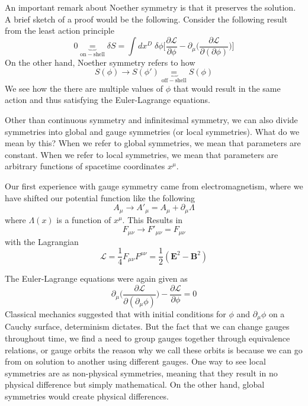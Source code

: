 \begin{thm}
An important remark about Noether symmetry is that it preserves the solution. A brief sketch of a proof would be the following. Consider the following result from the least action principle
\[0\underbrace{=}_{\mathrm{on-shell}}\delta S=\int dx^{D}\;\delta \phi \Big[\dfrac{\partial \mathcal{L}}{\partial \phi }-\partial _{\mu }\Big(\dfrac{\partial \mathcal{L}}{\partial (\partial \phi )} \Big) \Big]\]
On the other hand, Noether symmetry refers to how 
\[S(\phi )\rightarrow S(\phi ')\underbrace{=}_{\mathrm{off-shell}}S(\phi )\]
We see how the there are multiple values of $\phi $ that would result in the same action and thus satisfying the Euler-Lagrange equations. 
\end{thm}
\vspace{2ex}
\begin{rmk}
Other than continuous symmetry and infinitesimal symmetry, we can also divide symmetries into global and gauge symmetries (or local symmetries). What do we mean by this? When we refer to global symmetries, we mean that parameters are constant. When we refer to local symmetries, we mean that parameters are arbitrary functions of spacetime coordinates $x^{\mu }$. 
\end{rmk}
\vspace{2ex}
\begin{ex}
Our first experience with gauge symmetry came from electromagnetism, where we have shifted our potential function like the following
\[A_{\mu }\rightarrow A'_{\mu }=A_{\mu }+\partial _{\mu }\Lambda  \]
where $\Lambda(x) $ is a function of $x^{\mu }$. This Results in 
\[F_{\mu \nu }\rightarrow F'_{\mu \nu }=F_{\mu \nu }\]
with the Lagrangian
\[\mathcal{L}=\dfrac{1}{4}F_{\mu \nu }F^{\mu \nu }=\dfrac{1}{2}({\bm E}^2-{\bm B}^2)\]
\end{ex}
\vspace{2ex}
The Euler-Lagrange equations were again given as
\[\partial _{\mu }\Big(\dfrac{\partial \mathcal{L}}{\partial (\partial _{\mu }\phi )} \Big)-\dfrac{\partial \mathcal{L}}{\partial \phi } =0\]
Classical mechanics suggested that with initial conditions for $\phi $ and $\partial _{\mu }\phi $ on a Cauchy surface, determinism dictates. But the fact that we can change gauges throughout time, we find a need to group gauges together through equivalence relations, or gauge orbits the reason why we call these orbits is because we can go from on solution to another using different gauges. One way to see local symmetries are as non-physical symmetries, meaning that they result in no physical difference but simply mathematical. On the other hand, global symmetries would create physical differences.
